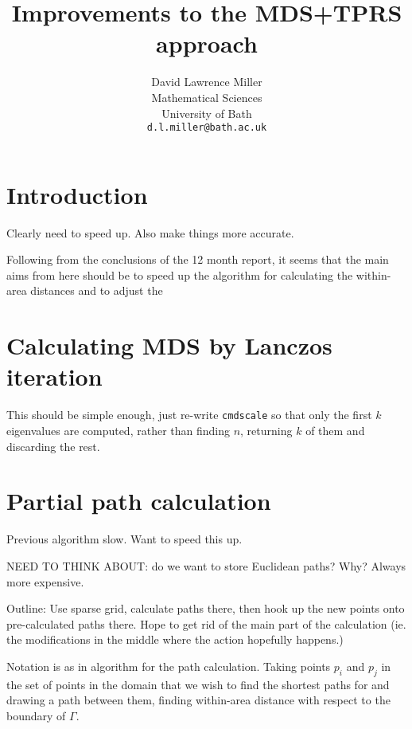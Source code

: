 \documentclass[a4paper,10pt]{article}
\title{Improvements to the MDS+TPRS approach}
\author{David Lawrence Miller\\Mathematical Sciences\\University of Bath\\\texttt{d.l.miller@bath.ac.uk}}
\begin{document}
 
 
 
\newtheorem{thm}{Theorem}[section]
 
\newtheorem{defn}{Definition}[section]
 
\maketitle

\section{Introduction}

Clearly need to speed up. Also make things more accurate.

Following from the conclusions of the 12 month report, it seems that the main aims from here should be to speed up the algorithm for calculating the within-area distances and to adjust the 


\section{Calculating MDS by Lanczos iteration}

This should be simple enough, just re-write \texttt{cmdscale} so that only the first $k$ eigenvalues are computed, rather than finding $n$, returning $k$ of them and discarding the rest.

\section{Partial path calculation}

Previous algorithm slow. Want to speed this up. 

NEED TO THINK ABOUT: do we want to store Euclidean paths? Why? Always more expensive.


Outline: Use sparse grid, calculate paths there, then hook up the new points onto pre-calculated paths there. Hope to get rid of the main part of the calculation (ie. the modifications in the middle where the action hopefully happens.)

Notation is as in algorithm for the path calculation. Taking points $p_i$ and $p_j$ in the set of points in the domain that we wish to find the shortest paths for and drawing a path between them, finding within-area distance with respect to the boundary of $\Gamma$.
\end{document}
